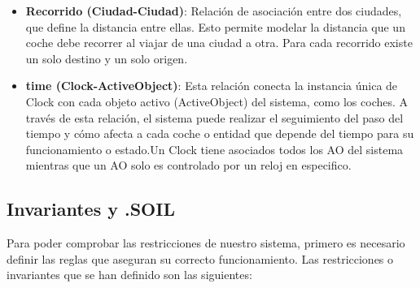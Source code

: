 \documentclass[12pt.a4paper]{article}
\begin{document}
\begin{itemize}
\item \textbf{Recorrido (Ciudad-Ciudad)}: Relación de asociación entre dos ciudades, que define la distancia entre ellas. Esto permite modelar la distancia que un coche debe recorrer al viajar de una ciudad a otra. Para cada recorrido existe un solo destino y un solo origen.


\item \textbf{time (Clock-ActiveObject)}: Esta relación conecta la instancia única de Clock con cada objeto activo (ActiveObject) del sistema, como los coches. A través de esta relación, el sistema puede realizar el seguimiento del paso del tiempo y cómo afecta a cada coche o entidad que depende del tiempo para su funcionamiento o estado.Un Clock tiene asociados todos los AO del sistema mientras que un AO solo es controlado por un reloj en especifico.
\end{itemize}

\subsection{Invariantes y .SOIL}
Para poder comprobar las restricciones de nuestro sistema, primero es necesario definir las reglas que aseguran su correcto funcionamiento. Las restricciones o invariantes que se han definido son las siguientes:
\end{document}
